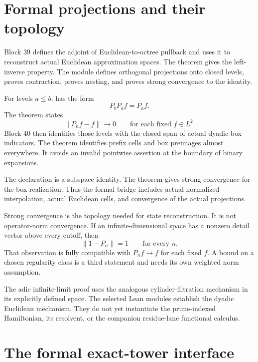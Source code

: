 \clearpage
\section{Formal projections and their topology}\label{a-verify-formal-projections}

Block 39 defines the adjoint of Euclidean-to-octree pullback and uses it to reconstruct actual Euclidean approximation spaces. The theorem  gives the left-inverse property. The module defines orthogonal projections onto closed levels, proves contraction, proves nesting, and proves strong convergence to the identity.

For levels \(a\le b\),  has the form
\[
 P_bP_af=P_af.
\]
The theorem  states
\[
 \|P_nf-f\|\longrightarrow0
 \qquad\text{for each fixed }f\in L^2.
\]
Block 40 then identifies those levels with the closed span of actual dyadic-box indicators. The theorem  identifies prefix cells and box preimages almost everywhere. It avoids an invalid pointwise assertion at the boundary of binary expansions.

The declaration  is a subspace identity. The theorem  gives strong convergence for the box realization. Thus the formal bridge includes actual normalized interpolation, actual Euclidean cells, and convergence of the actual projections.

Strong convergence is the topology needed for state reconstruction. It is not operator-norm convergence. If an infinite-dimensional space has a nonzero detail vector above every cutoff, then
\[
 \|1-P_n\|=1
 \qquad\text{for every }n.
\]
That observation is fully compatible with \(P_nf\to f\) for each fixed \(f\). A bound on a chosen regularity class is a third statement and needs its own weighted norm assumption.

The adic infinite-limit proof uses the analogous cylinder-filtration mechanism in its explicitly defined space. The selected Lean modules establish the dyadic Euclidean mechanism. They do not yet instantiate the prime-indexed Hamiltonian, its resolvent, or the companion residue-lane functional calculus.

\clearpage
\section{The formal exact-tower interface}\label{a-verify-formal-tower}

